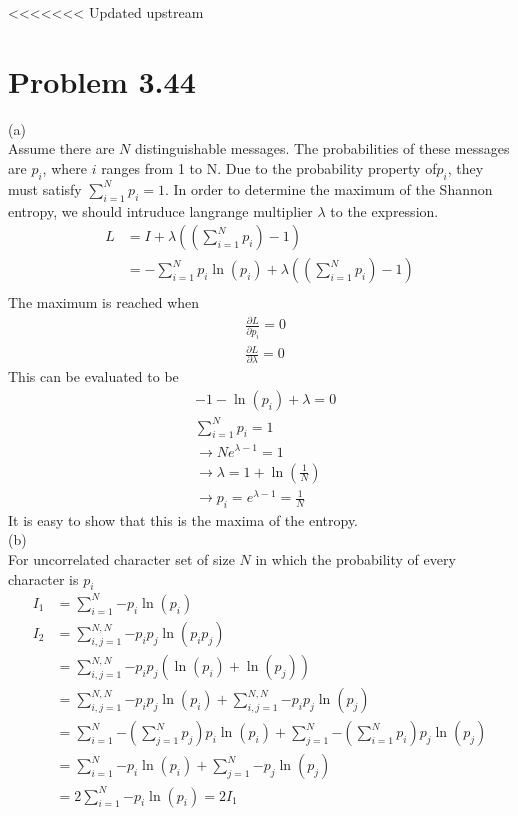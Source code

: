 \documentclass{article}
\begin{document}
<<<<<<< Updated upstream



\section*{Problem 3.44}
	(a)\\
	Assume there are $N$ distinguishable messages. The probabilities of these messages are $p_i$, where $i$ ranges from 1 to N. Due to the probability property of$p_i$, they must satisfy $\sum\limits_{i=1}^{N}{p_i}=1$. In order to determine the maximum of the Shannon entropy, we should intruduce langrange multiplier $\lambda$ to the expression.\\
	\begin{align}
		L&=I+\lambda((\sum\limits_{i=1}^{N}{p_i})-1)\\
		&=-\sum\limits_{i=1}^{N}{p_i \ln(p_i)}+\lambda((\sum\limits_{i=1}^{N}{p_i})-1)\\
	\end{align}
	The maximum is reached when
	\begin{align}
		&\frac{\partial L}{\partial p_i}=0\\
		&\frac{\partial L}{\partial \lambda}=0
	\end{align}
	This can be evaluated to be
	\begin{align}
		&-1-\ln(p_i)+\lambda=0\\
		&\sum\limits_{i=1}^{N}{p_i}=1\\
		&\rightarrow Ne^{\lambda-1}=1\\
		&\rightarrow \lambda=1+\ln(\frac{1}{N})\\
		&\rightarrow p_i=e^{\lambda-1}=\frac{1}{N}
	\end{align}
	It is easy to show that this is the maxima of the entropy.\\
	(b)\\
	For uncorrelated character set of size $N$ in which the probability of every character is $p_i$
	\begin{align}
		I_1&=\sum\limits_{i=1}^{N}{-p_i\ln(p_i)} \\
		I_2&=\sum\limits_{i,j=1}^{N,N}{-p_ip_j\ln(p_ip_j)}\\
		&=\sum\limits_{i,j=1}^{N,N}{-p_ip_j(\ln(p_i)+\ln(p_j))}\\
		&=\sum\limits_{i,j=1}^{N,N}{-p_ip_j\ln(p_i)}+\sum\limits_{i,j=1}^{N,N}{-p_ip_j\ln(p_j)}\\
		&=\sum\limits_{i=1}^{N}{-(\sum\limits_{j=1}^{N}{p_j})p_i\ln(p_i)}+\sum\limits_{j=1}^{N}{-(\sum\limits_{i=1}^{N}{p_i})p_j\ln(p_j)}\\
		&=\sum\limits_{i=1}^{N}{-p_i\ln(p_i)}+\sum\limits_{j=1}^{N}{-p_j\ln(p_j)}\\
		&=2\sum\limits_{i=1}^{N}{-p_i\ln(p_i)}=2I_1
	\end{align}
\end{document}

